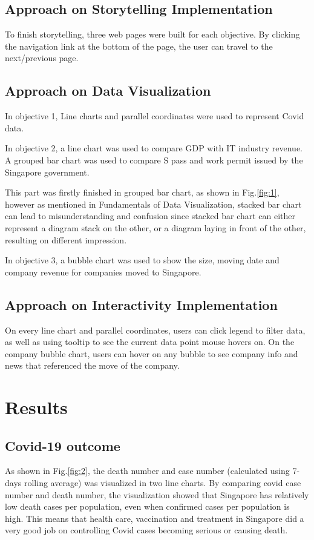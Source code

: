 \documentclass[conference]{IEEEtran}
\begin{document}
\subsection{Approach on Storytelling Implementation}
To finish storytelling, three web pages were built for each objective. By clicking the navigation link at the bottom of the page, the user can travel to the next/previous page. 

\subsection{Approach on Data Visualization}
In objective 1, Line charts and parallel coordinates were used to represent Covid data. 

In objective 2, a line chart was used to compare GDP with IT industry revenue. A grouped bar chart was used to compare S pass and work permit issued by the Singapore government.


This part was firstly finished in grouped bar chart, as shown in Fig.\ref{fig:1}, however as mentioned in Fundamentals of Data Visualization\cite{fundamentals}, stacked bar chart can lead to misunderstanding and confusion since stacked bar chart can either represent a diagram stack on the other, or a diagram laying in front of the other, resulting on different impression.

In objective 3, a bubble chart was used to show the size, moving date and company revenue for companies moved to Singapore.

\subsection{Approach on Interactivity Implementation}
On every line chart and parallel coordinates, users can click legend to filter data, as well as using tooltip to see the current data point mouse hovers on. On the company bubble chart, users can hover on any bubble to see company info and news that referenced the move of the company.

\section{Results}
\subsection{Covid-19 outcome}



As shown in Fig.\ref{fig:2}, the death number and case number (calculated using 7-days rolling average) was visualized in two line charts. By comparing covid case number and death number, the visualization showed that Singapore has relatively low death cases per population, even when confirmed cases per population is high. This means that health care, vaccination and treatment in Singapore did a very good job on controlling Covid cases becoming serious or causing death.
\end{document}
